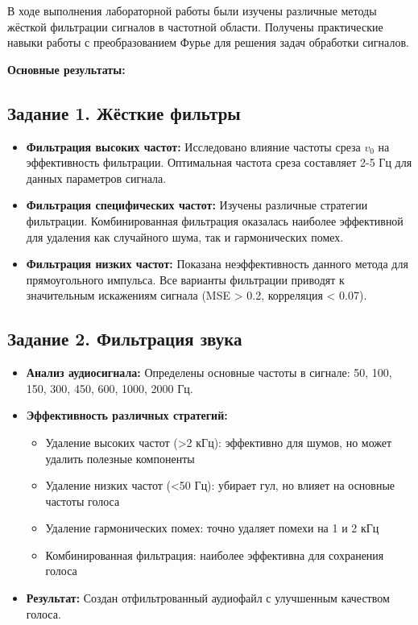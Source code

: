В ходе выполнения лабораторной работы были изучены различные методы жёсткой фильтрации сигналов в частотной области. Получены практические навыки работы с преобразованием Фурье для решения задач обработки сигналов.

\textbf{Основные результаты:}

\subsection*{Задание 1. Жёсткие фильтры}

\begin{itemize}
    \item \textbf{Фильтрация высоких частот:} Исследовано влияние частоты среза $v_0$ на эффективность фильтрации. Оптимальная частота среза составляет 2-5 Гц для данных параметров сигнала.
    
    \item \textbf{Фильтрация специфических частот:} Изучены различные стратегии фильтрации. Комбинированная фильтрация оказалась наиболее эффективной для удаления как случайного шума, так и гармонических помех.
    
    \item \textbf{Фильтрация низких частот:} Показана неэффективность данного метода для прямоугольного импульса. Все варианты фильтрации приводят к значительным искажениям сигнала (MSE > 0.2, корреляция < 0.07).
\end{itemize}

\subsection*{Задание 2. Фильтрация звука}

\begin{itemize}
    \item \textbf{Анализ аудиосигнала:} Определены основные частоты в сигнале: 50, 100, 150, 300, 450, 600, 1000, 2000 Гц.
    
    \item \textbf{Эффективность различных стратегий:}
    \begin{itemize}
        \item Удаление высоких частот (>2 кГц): эффективно для шумов, но может удалить полезные компоненты
        \item Удаление низких частот (<50 Гц): убирает гул, но влияет на основные частоты голоса
        \item Удаление гармонических помех: точно удаляет помехи на 1 и 2 кГц
        \item Комбинированная фильтрация: наиболее эффективна для сохранения голоса
    \end{itemize}
    
    \item \textbf{Результат:} Создан отфильтрованный аудиофайл с улучшенным качеством голоса.
\end{itemize}

